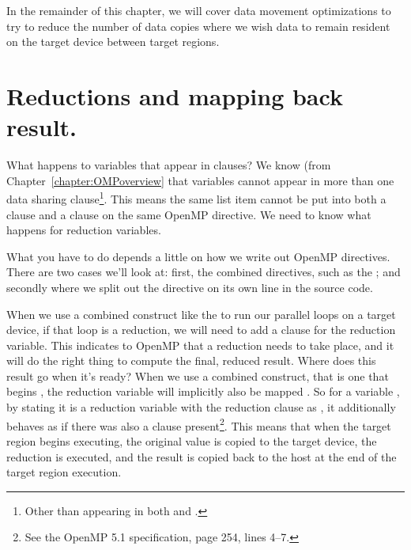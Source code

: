 In the remainder of this chapter, we will cover data movement optimizations to try to reduce the number of data copies where we wish data to remain resident on the target device between target regions.

\section{Reductions and mapping back result.}
\label{sec:target_reductions}

What happens to variables that appear in  clauses?
We know (from Chapter~\ref{chapter:OMPoverview} that variables cannot appear in more than one data sharing clause\footnote{Other than appearing in both  and .}.
This means the same list item cannot be put into both a  clause and a  clause on the same OpenMP directive.
We need to know what happens for reduction variables.

What you have to do depends a little on how we write out OpenMP directives.
There are two cases we'll look at: first, the combined directives, such as the \BUD; and secondly where we split out the  directive on its own line in the source code.

When we use a combined construct like the \BUD to run our parallel loops on a target device, if that loop is a reduction, we will need to add a  clause for the reduction variable.
This indicates to OpenMP that a reduction needs to take place, and it will do the right thing to compute the final, reduced result.
Where does this result go when it's ready?
When we use a combined construct, that is one that begins , the reduction variable will implicitly also be mapped .
So for a variable , by stating it is a reduction variable with the reduction clause as , it additionally behaves as if there was also a  clause present\footnote{See the OpenMP 5.1 specification, page 254, lines 4--7.}.
This means that when the target region begins executing, the original value is copied to the target device, the reduction is executed, and the result is copied back to the host at the end of the target region execution.

